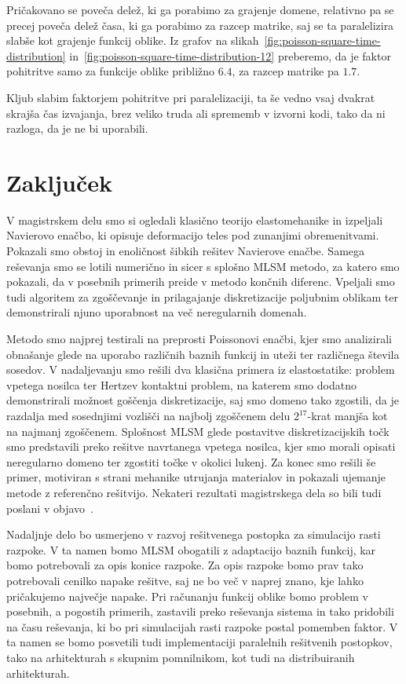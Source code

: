 \documentclass[12pt,a4paper,twoside]{article}
\theoremstyle{definition} %
\theoremstyle{plain} %
\numberwithin{equation}{section}
\let\oldsection\section
\def\section{\cleardoublepage\oldsection}
\begin{document}
Pričakovano se poveča delež, ki ga porabimo za grajenje domene, relativno pa se precej poveča delež
časa, ki ga porabimo za razcep matrike, saj se ta paralelizira slabše kot grajenje funkcij oblike.
Iz grafov na slikah~\ref{fig:poisson-square-time-distribution}
in~\ref{fig:poisson-square-time-distribution-12} preberemo, da je faktor pohitritve samo za funkcije
oblike približno $6.4$, za razcep matrike pa $1.7$.

Kljub slabim faktorjem pohitritve pri paralelizaciji, ta še vedno vsaj dvakrat skrajša čas izvajanja,
brez veliko truda ali sprememb v izvorni kodi, tako da ni razloga, da je ne bi uporabili.

\section{Zaključek}

V magistrskem delu smo si ogledali klasično teorijo elastomehanike in izpeljali Navierovo enačbo, ki
opisuje deformacijo teles pod zunanjimi obremenitvami. Pokazali smo obstoj in enoličnost šibkih
rešitev Navierove enačbe. Samega reševanja smo se lotili numerično in sicer s splošno MLSM metodo,
za katero smo pokazali, da v posebnih primerih preide v metodo končnih diferenc. Vpeljali smo tudi
algoritem za zgoščevanje in prilagajanje diskretizacije poljubnim oblikam ter demonstrirali njuno
uporabnost na več neregularnih domenah.

Metodo smo najprej testirali na preprosti Poissonovi enačbi, kjer smo analizirali obnašanje glede na
uporabo različnih baznih funkcij in uteži ter različnega števila sosedov. V nadaljevanju smo rešili
dva klasična primera iz elastostatike: problem vpetega nosilca ter Hertzev kontaktni problem,
na katerem smo dodatno demonstrirali možnost goščenja diskretizacije, saj smo domeno tako zgostili,
da je razdalja med sosednjimi vozlišči na najbolj zgoščenem delu $2^{17}$-krat manjša kot na najmanj
zgoščenem. Splošnost MLSM glede postavitve diskretizacijskih točk smo predstavili preko rešitve
navrtanega vpetega nosilca, kjer smo morali opisati neregularno domeno ter zgostiti točke v okolici
lukenj. Za konec smo rešili še primer, motiviran s strani mehanike utrujanja materialov in
pokazali ujemanje metode z referenčno rešitvijo. Nekateri rezultati magistrskega dela so bili tudi
poslani v objavo~\cite{slak2017refined}.

Nadaljnje delo bo usmerjeno v razvoj rešitvenega postopka za simulacijo rasti razpoke. V ta namen
bomo MLSM obogatili z adaptacijo baznih funkcij, kar bomo potrebovali za opis konice razpoke. Za
opis razpoke bomo prav tako potrebovali cenilko napake rešitve, saj ne bo več v naprej znano, kje
lahko pričakujemo največje napake. Pri računanju funkcij oblike bomo problem v posebnih, a pogostih
primerih, zastavili preko reševanja sistema in tako pridobili na času reševanja, ki bo pri
simulacijah rasti razpoke postal pomemben faktor. V ta namen se bomo posvetili tudi implementaciji
paralelnih rešitvenih postopkov, tako na arhitekturah s skupnim pomnilnikom, kot tudi na
distribuiranih arhitekturah.
\end{document}
